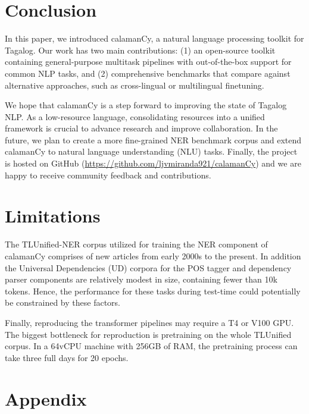 \documentclass[11pt]{article}
\begin{document}
\section{Conclusion}

In this paper, we introduced calamanCy, a natural language processing toolkit for Tagalog.
Our work has two main contributions: (1) an open-source toolkit containing general-purpose multitask pipelines with out-of-the-box support for common NLP tasks, and
(2) comprehensive benchmarks that compare against alternative approaches, such as cross-lingual or multilingual finetuning. 

We hope that calamanCy is a step forward to improving the state of Tagalog NLP. 
As a low-resource language, consolidating resources into a unified framework is crucial to advance research and improve collaboration.
In the future, we plan to create a more fine-grained NER benchmark corpus and extend calamanCy to natural language understanding (NLU) tasks.
Finally, the project is hosted on GitHub (\url{https://github.com/ljvmiranda921/calamanCy}) and we are happy to receive community feedback and contributions.

\section*{Limitations}

The TLUnified-NER corpus utilized for training the NER component of calamanCy comprises of new articles from early 2000s to the present.
In addition the Universal Dependencies (UD) corpora for the POS tagger and dependency parser components are relatively modest in size, containing fewer than 10k tokens.
Hence, the performance for these tasks during test-time could potentially be constrained by these factors.

Finally, reproducing the transformer pipelines may require a T4 or V100 GPU. 
The biggest bottleneck for reproduction is pretraining on the whole TLUnified corpus.
In a 64vCPU machine with 256GB of RAM, the pretraining process can take three full days for 20 epochs.




\appendix

\section{Appendix}
\end{document}
